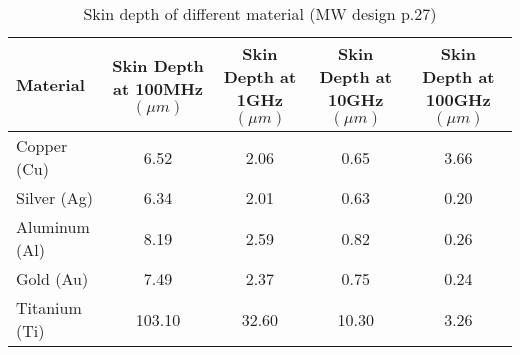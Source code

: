 \begin{table}
\caption{Skin depth of different material (MW design p.27)}
\label{tab:skin-depth}
\begin{tabular}{l|c|c|c|c}
\toprule
Material & \makecell{Skin Depth\\at 100MHz $(\unit{\mu m})$} & \makecell{Skin Depth\\at 1GHz $(\unit{\mu m})$} & \makecell{Skin Depth\\at 10GHz $(\unit{\mu m})$} & \makecell{Skin Depth\\at 100GHz $(\unit{\mu m})$} \\
\midrule
\hline
Copper (Cu) & 6.52 & 2.06 & 0.65 & 3.66 \\
Silver (Ag) & 6.34 & 2.01 & 0.63 & 0.20 \\
Aluminum (Al) & 8.19 & 2.59 & 0.82 & 0.26 \\
Gold (Au) & 7.49 & 2.37 & 0.75 & 0.24 \\
Titanium (Ti) & 103.10 & 32.60 & 10.30 & 3.26 \\
\bottomrule
\end{tabular}
\end{table}